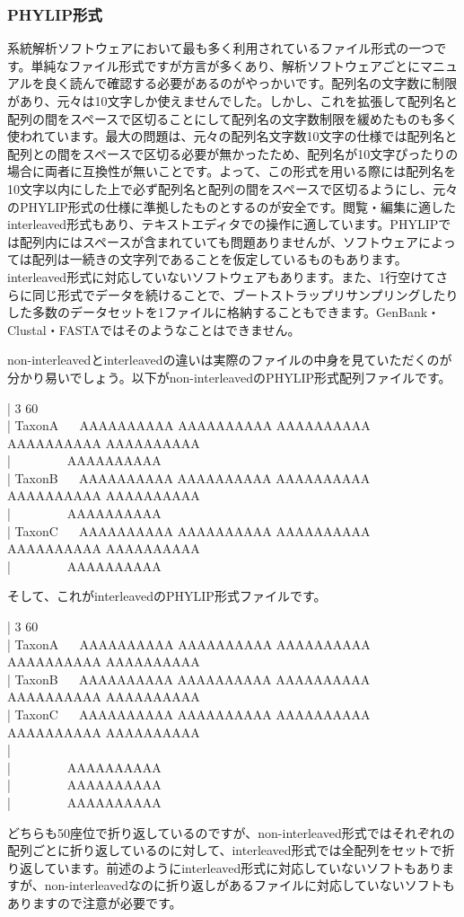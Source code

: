 \documentclass[titlepage,10pt,a4paper]{jsbook}
\newenvironment{content}{\begin{shaded}\vspace{-1em}\raggedright\ttfamily\footnotesize\setlength{\baselineskip}{1.4em}}{\end{shaded}\vspace{-1em}}
\begin{document}
\subsubsection{PHYLIP形式}

系統解析ソフトウェアにおいて最も多く利用されているファイル形式の一つです。単純なファイル形式ですが方言が多くあり、解析ソフトウェアごとにマニュアルを良く読んで確認する必要があるのがやっかいです。配列名の文字数に制限があり、元々は10文字しか使えませんでした。しかし、これを拡張して配列名と配列の間をスペースで区切ることにして配列名の文字数制限を緩めたものも多く使われています。最大の問題は、元々の配列名文字数10文字の仕様では配列名と配列との間をスペースで区切る必要が無かったため、配列名が10文字ぴったりの場合に両者に互換性が無いことです。よって、この形式を用いる際には配列名を10文字以内にした上で必ず配列名と配列の間をスペースで区切るようにし、元々のPHYLIP形式の仕様に準拠したものとするのが安全です。閲覧・編集に適したinterleaved形式もあり、テキストエディタでの操作に適しています。PHYLIPでは配列内にはスペースが含まれていても問題ありませんが、ソフトウェアによっては配列は一続きの文字列であることを仮定しているものもあります。interleaved形式に対応していないソフトウェアもあります。また、1行空けてさらに同じ形式でデータを続けることで、ブートストラップリサンプリングしたりした多数のデータセットを1ファイルに格納することもできます。GenBank・Clustal・FASTAではそのようなことはできません。

non-interleavedとinterleavedの違いは実際のファイルの中身を見ていただくのが分かり易いでしょう。以下がnon-interleavedのPHYLIP形式配列ファイルです。
\begin{content}
| 3 60\\
| TaxonA~ ~ AAAAAAAAAA AAAAAAAAAA AAAAAAAAAA AAAAAAAAAA AAAAAAAAAA\\
| ~ ~ ~ ~ ~ AAAAAAAAAA\\
| TaxonB~ ~ AAAAAAAAAA AAAAAAAAAA AAAAAAAAAA AAAAAAAAAA AAAAAAAAAA\\
| ~ ~ ~ ~ ~ AAAAAAAAAA\\
| TaxonC~ ~ AAAAAAAAAA AAAAAAAAAA AAAAAAAAAA AAAAAAAAAA AAAAAAAAAA\\
| ~ ~ ~ ~ ~ AAAAAAAAAA
\end{content}
そして、これがinterleavedのPHYLIP形式ファイルです。
\begin{content}
| 3 60\\
| TaxonA~ ~ AAAAAAAAAA AAAAAAAAAA AAAAAAAAAA AAAAAAAAAA AAAAAAAAAA\\
| TaxonB~ ~ AAAAAAAAAA AAAAAAAAAA AAAAAAAAAA AAAAAAAAAA AAAAAAAAAA\\
| TaxonC~ ~ AAAAAAAAAA AAAAAAAAAA AAAAAAAAAA AAAAAAAAAA AAAAAAAAAA\\
| ~\\
| ~ ~ ~ ~ ~ AAAAAAAAAA\\
| ~ ~ ~ ~ ~ AAAAAAAAAA\\
| ~ ~ ~ ~ ~ AAAAAAAAAA
\end{content}
どちらも50座位で折り返しているのですが、non-interleaved形式ではそれぞれの配列ごとに折り返しているのに対して、interleaved形式では全配列をセットで折り返しています。前述のようにinterleaved形式に対応していないソフトもありますが、non-interleavedなのに折り返しがあるファイルに対応していないソフトもありますので注意が必要です。
\end{document}

